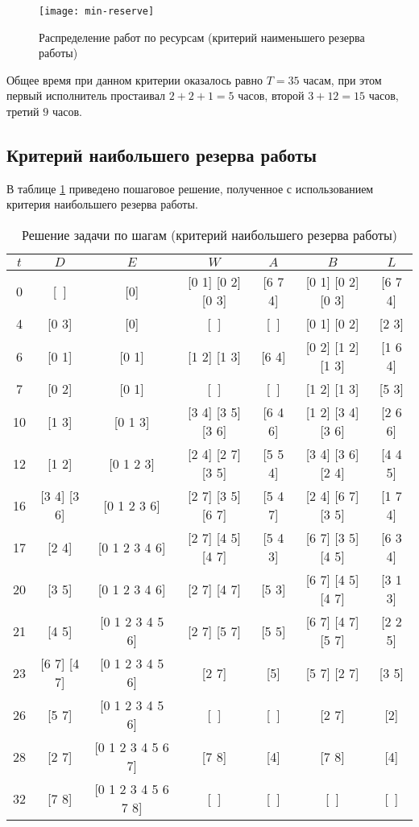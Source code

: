 \begin{figure}[H]
	\begin{center}
		\texttt{[image: min-reserve]}
		\caption{Распределение работ по ресурсам (критерий наименьшего резерва работы)}
		\label{fig:min-reserve}
	\end{center}
\end{figure}

Общее время при данном критерии оказалось равно $T = 35$ часам, при этом первый исполнитель простаивал $2 + 2 + 1 = 5$ часов, второй $3 + 12 = 15$ часов, третий $9$ часов.

\newpage

\subsection{Критерий наибольшего резерва работы}

В таблице \ref{tab:max-reserve} приведено пошаговое решение, полученное с использованием критерия наибольшего резерва работы.

\begin{table}[H]
	\centering
	\def\tabcolsep{4pt}
	\def\arraystretch{1.3}
	\caption{Решение задачи по шагам (критерий наибольшего резерва работы)}
	\label{tab:max-reserve}
	\begin{tabular}{|c|c|c|c|c|c|c|}
		\hline
		$t$ & $D$ & $E$ & $W$ & $A$ & $B$ & $L$ \\ \hline
		0 & [~] & [0] & [0 1] [0 2] [0 3] & [6 7 4] & [0 1] [0 2] [0 3] & [6 7 4] \\ \hline
		4 & [0 3] & [0] & [~] & [~] & [0 1] [0 2] & [2 3] \\ \hline
		6 & [0 1] & [0 1] & [1 2] [1 3] & [6 4] & [0 2] [1 2] [1 3] & [1 6 4] \\ \hline
		7 & [0 2] & [0 1] & [~] & [~] & [1 2] [1 3] & [5 3] \\ \hline
		10 & [1 3] & [0 1 3] & [3 4] [3 5] [3 6] & [6 4 6] & [1 2] [3 4] [3 6] & [2 6 6] \\ \hline
		12 & [1 2] & [0 1 2 3] & [2 4] [2 7] [3 5] & [5 5 4] & [3 4] [3 6] [2 4] & [4 4 5] \\ \hline
		16 & [3 4] [3 6] & [0 1 2 3 6] & [2 7] [3 5] [6 7] & [5 4 7] & [2 4] [6 7] [3 5] & [1 7 4] \\ \hline
		17 & [2 4] & [0 1 2 3 4 6] & [2 7] [4 5] [4 7] & [5 4 3] & [6 7] [3 5] [4 5] & [6 3 4] \\ \hline
		20 & [3 5] & [0 1 2 3 4 6] & [2 7] [4 7] & [5 3] & [6 7] [4 5] [4 7] & [3 1 3] \\ \hline
		21 & [4 5] & [0 1 2 3 4 5 6] & [2 7] [5 7] & [5 5] & [6 7] [4 7] [5 7] & [2 2 5] \\ \hline
		23 & [6 7] [4 7] & [0 1 2 3 4 5 6] & [2 7] & [5] & [5 7] [2 7] & [3 5] \\ \hline
		26 & [5 7] & [0 1 2 3 4 5 6] & [~] & [~] & [2 7] & [2] \\ \hline
		28 & [2 7] & [0 1 2 3 4 5 6 7] & [7 8] & [4] & [7 8] & [4] \\ \hline
		32 & [7 8] & [0 1 2 3 4 5 6 7 8] & [~] & [~] & [~] & [~] \\ \hline
	\end{tabular}
\end{table}

